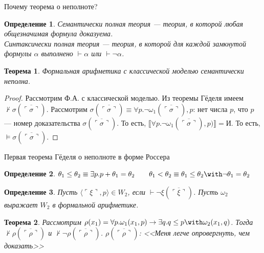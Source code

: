 \documentclass[aspectratio=169]{beamer}
\newtheorem{thm}{Теорема}[section]
\newtheorem{dfn}{Определение}[section]
\begin{document}
\begin{frame}{Почему теорема о неполноте?}
\begin{dfn}\emph{Семантически} полная теория --- теория, в которой любая общезначимая формула доказуема.\\
\emph{Синтаксически} полная теория --- теория, в которой для каждой замкнутой формулы $\alpha$ выполнено $\vdash\alpha$ или $\vdash\neg\alpha$.\end{dfn}
\begin{thm}Формальная арифметика с классической моделью семантически неполна.\end{thm} \pause
\begin{proof}
 Рассмотрим Ф.А. с классической моделью. \pause
 Из теоремы Гёделя имеем $\not\vdash\sigma(\overline{\ulcorner\sigma\urcorner})$. \pause
 Рассмотрим $\sigma(\overline{\ulcorner\sigma\urcorner}) \equiv \forall p.\neg\omega_1(\overline{\ulcorner\sigma\urcorner}),p$:
нет числа $p$, что $p$ --- номер доказательства $\sigma(\overline{\ulcorner\sigma\urcorner})$. \pause 
 То есть, $\llbracket \forall p.\neg\omega_1(\overline{\ulcorner\sigma\urcorner}),p) \rrbracket = \text{И}$. \pause
 То есть, $\models \sigma(\overline{\ulcorner\sigma\urcorner})$.
\end{proof}

\end{frame}

\begin{frame}{Первая теорема Гёделя о неполноте в форме Россера}
\begin{dfn}$\theta_1\le\theta_2 \equiv \exists p.p+\theta_1=\theta_2\quad\quad\theta_1<\theta_2\equiv\theta_1\le\theta_2\with\neg\theta_1=\theta_2$\end{dfn}\pause
\begin{dfn}Пусть $\langle \ulcorner\xi\urcorner,p\rangle \in W_2$, если $\vdash\neg\xi(\overline{\ulcorner\xi\urcorner})$.
Пусть $\omega_2$ выражает $W_2$ в формальной арифметике.\end{dfn}\pause
\begin{thm}Рассмотрим $\rho(x_1) = \forall p.\omega_1(x_1,p)\rightarrow\exists q.q \le p \with \omega_2(x_1,q)$. \pause
Тогда $\not\vdash\rho(\overline{\ulcorner\rho\urcorner})$ и $\not\vdash\neg\rho(\overline{\ulcorner\rho\urcorner})$. \pause
$\rho(\overline{\ulcorner\rho\urcorner})$: <<Меня легче опровергнуть, чем доказать>>
\end{thm}%
\end{frame}
\end{document}
